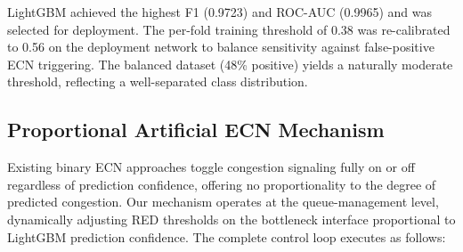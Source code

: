 \documentclass[journal]{IEEEtran}
\begin{document}
LightGBM achieved the highest F1 (0.9723) and ROC-AUC (0.9965) and was selected for deployment. The per-fold training threshold of 0.38 was re-calibrated to 0.56 on the deployment network to balance sensitivity against false-positive ECN triggering. The balanced dataset (48\% positive) yields a naturally moderate threshold, reflecting a well-separated class distribution.

\subsection{Proportional Artificial ECN Mechanism}

Existing binary ECN approaches toggle congestion signaling fully on or off regardless of prediction confidence, offering no proportionality to the degree of predicted congestion. Our mechanism operates at the queue-management level, dynamically adjusting RED thresholds on the bottleneck interface proportional to LightGBM prediction confidence. The complete control loop executes as follows:
\end{document}
